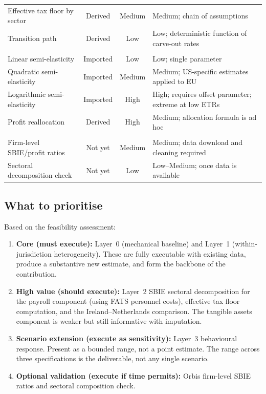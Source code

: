 \documentclass[11pt,a4paper]{article}
\begin{document}
\begin{table}[H]
\begin{tabular}{@{}p{4cm}ccp{6cm}@{}}
Effective tax floor by sector & Derived & Medium & Medium; chain of assumptions \\
Transition path & Derived & Low & Low; deterministic function of carve-out rates \\
\addlinespace
\multicolumn{4}{l}{\textit{Layer 3: Behavioural response}} \\
Linear semi-elasticity & Imported & Low & Low; single parameter \\
Quadratic semi-elasticity & Imported & Medium & Medium; US-specific estimates applied to EU \\
Logarithmic semi-elasticity & Imported & High & High; requires offset parameter; extreme at low ETRs \\
Profit reallocation & Derived & High & Medium; allocation formula is ad hoc \\
\addlinespace
\multicolumn{4}{l}{\textit{Optional: Orbis validation}} \\
Firm-level SBIE/profit ratios & Not yet & Medium & Medium; data download and cleaning required \\
Sectoral decomposition check & Not yet & Low & Low--Medium; once data is available \\
\bottomrule
\end{tabular}
\end{table}

\subsection{What to prioritise}\label{sec:prioritise}

Based on the feasibility assessment:

\begin{enumerate}
\item \textbf{Core (must execute):} Layer~0 (mechanical baseline) and Layer~1 (within-jurisdiction heterogeneity). These are fully executable with existing data, produce a substantive new estimate, and form the backbone of the contribution.
\item \textbf{High value (should execute):} Layer~2 SBIE sectoral decomposition for the payroll component (using FATS personnel costs), effective tax floor computation, and the Ireland--Netherlands comparison. The tangible assets component is weaker but still informative with imputation.
\item \textbf{Scenario extension (execute as sensitivity):} Layer~3 behavioural response. Present as a bounded range, not a point estimate. The range across three specifications is the deliverable, not any single scenario.
\item \textbf{Optional validation (execute if time permits):} Orbis firm-level SBIE ratios and sectoral composition check.
\end{enumerate}
\end{document}
